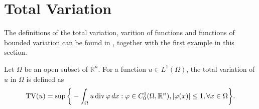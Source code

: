 \section{Total Variation} %
\label{sec:total_variation}
    
    The definitions of the total variation, varition of functions and functions of bounded variation can be found in \cite{Giusti}, together with the first example in this section.

    \begin{definition} %
    \label{def:total_variation}

        Let $\Omega$ be an open subset of $\mathbb{R}^{n}$. For a function $u \in L^{1}(\Omega)$, the \textnormal{total variation} of $u$ in $\Omega$ is defined as
            \begin{equation}
                \textnormal{TV}(u) = \sup \bigg\{ -\int_{\Omega} u\, \textnormal{div}\, \varphi\, dx : \varphi \in C^{1}_{0}(\Omega, \mathbb{R}^{n}), |\varphi(x)| \le 1, \forall x \in \Omega \bigg\}.
                \label{eq:total_variation}
            \end{equation}

    \end{definition}

